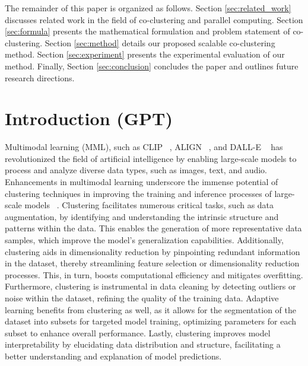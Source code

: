 \documentclass[journal]{IEEEtran}
\renewcommand{\cite}[1]{~\autocite{#1}}
\begin{document}
The remainder of this paper is organized as follows. Section \ref{sec:related_work} discusses related work in the field of co-clustering and parallel computing. Section \ref{sec:formula} presents the mathematical formulation and problem statement of co-clustering. Section \ref{sec:method} details our proposed scalable co-clustering method. Section \ref{sec:experiment} presents the experimental evaluation of our method. Finally, Section \ref{sec:conclusion} concludes the paper and outlines future research directions.

\section{Introduction (GPT)}
Multimodal learning (MML), such as CLIP \cite{radford2021LearningTransferableVisual}, ALIGN \cite{li2022BLIPBootstrappingLanguageimage}, and DALL-E \cite{ramesh2021ZeroshotTexttoimageGeneration} has revolutionized the field of artificial intelligence by enabling large-scale models to process and analyze diverse data types, such as images, text, and audio.
Enhancements in multimodal learning underscore the immense potential of clustering techniques in improving the training and inference processes of large-scale models \cite{raskutti2002CombiningClusteringCotraining, luo2024CLEARClusterenhancedContrast,purwar2015HybridPredictionModel,lian2014GeoMFJointGeographical}.
Clustering facilitates numerous critical tasks, such as data augmentation, by identifying and understanding the intrinsic structure and patterns within the data.
This enables the generation of more representative data samples, which improve the model's generalization capabilities. Additionally, clustering aids in dimensionality reduction by pinpointing redundant information in the dataset, thereby streamlining feature selection or dimensionality reduction processes. This, in turn, boosts computational efficiency and mitigates overfitting. Furthermore, clustering is instrumental in data cleaning by detecting outliers or noise within the dataset, refining the quality of the training data. Adaptive learning benefits from clustering as well, as it allows for the segmentation of the dataset into subsets for targeted model training, optimizing parameters for each subset to enhance overall performance. Lastly, clustering improves model interpretability by elucidating data distribution and structure, facilitating a better understanding and explanation of model predictions.
\end{document}
